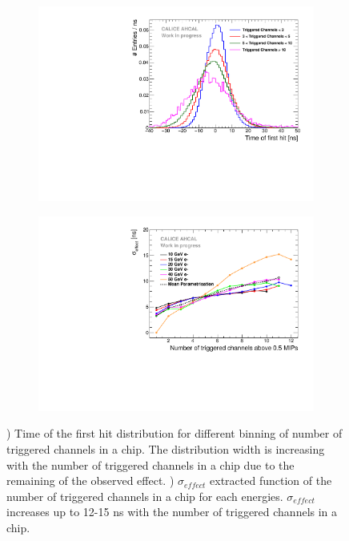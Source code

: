 \begin{figure}[htbp!]
	\begin{subfigure}[t]{0.49\textwidth}
		\centering
		\includegraphics[width=1\linewidth]{../Thesis_Plots/Timing/Electrons/Plots/TimingHitsBins.pdf}
		\caption{} \label{fig:ped_shift_dist_para}
	\end{subfigure}
	\hfill
	\begin{subfigure}[t]{0.49\textwidth}
		\centering
		\includegraphics[width=1\linewidth]{../Thesis_Plots/Timing/Electrons/Plots/MeanParametrisation.pdf}
		\caption{} \label{fig:para_fit}
	\end{subfigure}
	\caption{) Time of the first hit distribution for different binning of number of triggered channels in a chip. The distribution width is increasing with the number of triggered channels in a chip due to the remaining of the observed effect. ) $\sigma_{effect}$ extracted function of the number of triggered channels in a chip for each energies. $\sigma_{effect}$ increases up to 12-15 ns with the number of triggered channels in a chip.}
\end{figure}

